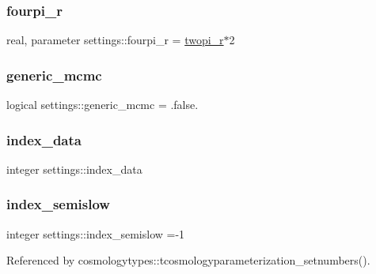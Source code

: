 \mbox{\label{namespacesettings_a84f03a75cdf655bea4a1568443921c37}} 
\subsubsection{\texorpdfstring{fourpi\+\_\+r}{fourpi\_r}}
{\footnotesize\ttfamily real, parameter settings\+::fourpi\+\_\+r = \mbox{\hyperlink{namespacesettings_a87b6f8cb970e358fc23b950e8db62257}{twopi\+\_\+r}}$\ast$2}

\mbox{\label{namespacesettings_af46cd3e56cf132b962ba2a208f29b04f}} 
\subsubsection{\texorpdfstring{generic\+\_\+mcmc}{generic\_mcmc}}
{\footnotesize\ttfamily logical settings\+::generic\+\_\+mcmc = .false.}

\mbox{\label{namespacesettings_a80a8fe2bea1b08d8109b2cfcb09cb02c}} 
\subsubsection{\texorpdfstring{index\+\_\+data}{index\_data}}
{\footnotesize\ttfamily integer settings\+::index\+\_\+data}

\mbox{\label{namespacesettings_a56f153f87bcbfcf9717c0efc77c20fb8}} 
\subsubsection{\texorpdfstring{index\+\_\+semislow}{index\_semislow}}
{\footnotesize\ttfamily integer settings\+::index\+\_\+semislow =-\/1}



Referenced by cosmologytypes\+::tcosmologyparameterization\+\_\+setnumbers().

